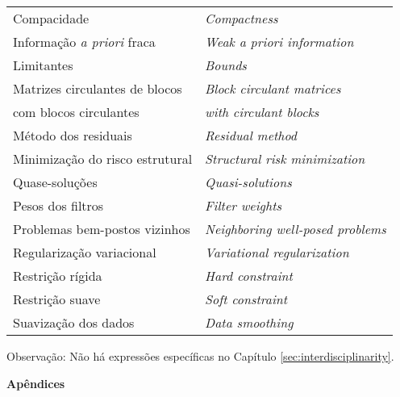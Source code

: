 \begin{table}[H]
\begin{center}
\begin{tabular}{ l l }
Compacidade & \textit{Compactness}\\
Informação \textit{a priori} fraca & \textit{Weak a priori information}\\
Limitantes & \textit{Bounds}\\
Matrizes circulantes de blocos & \textit{Block circulant matrices} \\
\quad com blocos circulantes & \quad  \textit{with circulant blocks} \\
Método dos residuais & \textit{Residual method}\\
Minimização do risco estrutural & \textit{Structural risk minimization}\\
Quase-soluções & \textit{Quasi-solutions}\\
Pesos dos filtros & \textit{Filter weights} \\
Problemas bem-postos vizinhos &  \textit{Neighboring well-posed problems} \\
Regularização variacional & \textit{Variational regularization} \\
Restrição rígida & \textit{Hard constraint} \\
Restrição suave & \textit{Soft constraint} \\
Suavização dos dados & \textit{Data smoothing}\\
\end{tabular}
\end{center}
\end{table}

\vfill

Observação: Não há expressões específicas no Capítulo \ref{sec:interdisciplinarity}. 

\newpage
\begin{center}
\textbf{Apêndices}
\end{center}

